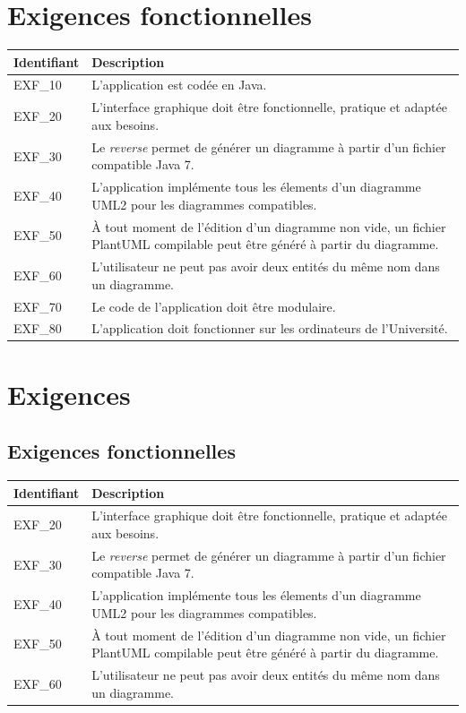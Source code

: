 \documentclass[hidelinks, 10pt,a4paper]{article}
\begin{document}
\section{Exigences fonctionnelles}
\begin{center}
    \begin{tabular}{|l|p{10cm}|}
        \hline{\textbf{Identifiant}} & {\textbf{Description}}\\\hline
        {EXF\_10} & {L’application est codée en Java.}\\\hline
        {EXF\_20} & {L’interface graphique doit être fonctionnelle, pratique et adaptée aux besoins.}\\\hline
        {EXF\_30} & {Le \textit{reverse} permet de générer un diagramme à partir d'un fichier compatible Java 7.}\\\hline
        {EXF\_40} & {L’application implémente tous les élements d’un diagramme UML2 pour les diagrammes compatibles.}\\\hline
        {EXF\_50} & {À tout moment de l’édition d’un diagramme non vide, un fichier PlantUML compilable peut être généré à partir du diagramme.}\\\hline
        {EXF\_60} & {L’utilisateur ne peut pas avoir deux entités du même nom dans un diagramme.}\\\hline
        {EXF\_70} & {Le code de l’application doit être modulaire.}\\\hline
        {EXF\_80} & {L’application doit fonctionner sur les ordinateurs de l’Université.}\\\hline
    \end{tabular}
\end{center}

\section{Exigences}
  \subsection{Exigences fonctionnelles}
    \begin{center}
	\begin{tabular}{|l|p{10cm}|}
	    \hline{\textbf{Identifiant}} & {\textbf{Description}}\\\hline
	    {EXF\_20} & {L’interface graphique doit être fonctionnelle, pratique et adaptée aux besoins.}\\\hline
	    {EXF\_30} & {Le \textit{reverse} permet de générer un diagramme à partir d'un fichier compatible Java 7.}\\\hline
	    {EXF\_40} & {L’application implémente tous les élements d’un diagramme UML2 pour les diagrammes compatibles.}\\\hline
	    {EXF\_50} & {À tout moment de l’édition d’un diagramme non vide, un fichier PlantUML compilable peut être généré à partir du diagramme.}\\\hline
	    {EXF\_60} & {L’utilisateur ne peut pas avoir deux entités du même nom dans un diagramme.}\\\hline
	\end{tabular}
    \end{center}
\end{document}
